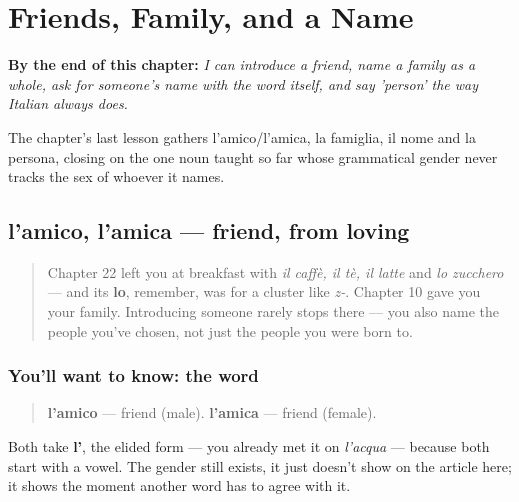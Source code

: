 
\chapter{Friends, Family, and a Name}
\label{ch:it-friends-family-name}

\begin{chapteropening}
\textbf{By the end of this chapter:} \emph{I can introduce a friend, name a family as a whole, ask for someone's name with the word itself, and say 'person' the way Italian always does.}

The chapter's last lesson gathers l'amico/l'amica, la famiglia, il nome and la persona, closing on the one noun taught so far whose grammatical gender never tracks the sex of whoever it names.
\end{chapteropening}

\section[l'amico, l'amica]{l'amico, l'amica — friend, from loving}

\label{lesson:IT-C23-amico-amica}



\begin{quote}
Chapter 22 left you at breakfast with \emph{il caffè, il tè, il latte} and \emph{lo zucchero} — and its \textbf{lo}, remember, was for a cluster like \emph{z-}. Chapter 10 gave you your family. Introducing someone rarely stops there — you also name the people you've chosen, not just the people you were born to.
\end{quote}

\subsection*{You'll want to know: the word}
\begin{quote}
\textbf{l'amico} — friend (male). \textbf{l'amica} — friend (female).
\end{quote}

Both take \textbf{l'}, the elided form — you already met it on \emph{l'acqua} — because both start with a vowel. The gender still exists, it just doesn't show on the article here; it shows the moment another word has to agree with it.


